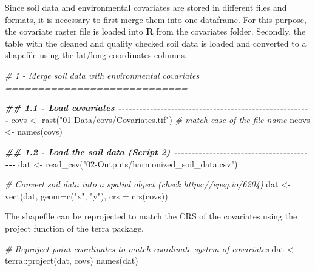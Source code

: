\documentclass[
  10pt,
  b5paper,
  oneside]{book}
\newenvironment{Shaded}{\begin{snugshade}}{\end{snugshade}}
\newcommand{\AttributeTok}[1]{\textcolor[rgb]{0.77,0.63,0.00}{#1}}
\newcommand{\CommentTok}[1]{\textcolor[rgb]{0.56,0.35,0.01}{\textit{#1}}}
\newcommand{\DocumentationTok}[1]{\textcolor[rgb]{0.56,0.35,0.01}{\textbf{\textit{#1}}}}
\newcommand{\FunctionTok}[1]{\textcolor[rgb]{0.00,0.00,0.00}{#1}}
\newcommand{\NormalTok}[1]{#1}
\newcommand{\OtherTok}[1]{\textcolor[rgb]{0.56,0.35,0.01}{#1}}
\newcommand{\SpecialCharTok}[1]{\textcolor[rgb]{0.00,0.00,0.00}{#1}}
\newcommand{\StringTok}[1]{\textcolor[rgb]{0.31,0.60,0.02}{#1}}
\begin{document}
Since soil data and environmental covariates are stored in different files and formats, it is necessary to first merge them into one dataframe. For this purpose, the covariate raster file is loaded into \textbf{R} from the covariates folder. Secondly, the table with the cleaned and quality checked soil data is loaded and converted to a shapefile using the lat/long coordinates columns.

\begin{Shaded}
\begin{Highlighting}[]
\CommentTok{\# 1 {-} Merge soil data with environmental covariates ============================}

\DocumentationTok{\#\# 1.1 {-} Load covariates {-}{-}{-}{-}{-}{-}{-}{-}{-}{-}{-}{-}{-}{-}{-}{-}{-}{-}{-}{-}{-}{-}{-}{-}{-}{-}{-}{-}{-}{-}{-}{-}{-}{-}{-}{-}{-}{-}{-}{-}{-}{-}{-}{-}{-}{-}{-}{-}{-}{-}{-}{-}{-}{-}{-}}
\NormalTok{covs }\OtherTok{\textless{}{-}} \FunctionTok{rast}\NormalTok{(}\StringTok{"01{-}Data/covs/Covariates.tif"}\NormalTok{) }\CommentTok{\# match case of the file name}
\NormalTok{ncovs }\OtherTok{\textless{}{-}} \FunctionTok{names}\NormalTok{(covs)}

\DocumentationTok{\#\# 1.2 {-} Load the soil data (Script 2) {-}{-}{-}{-}{-}{-}{-}{-}{-}{-}{-}{-}{-}{-}{-}{-}{-}{-}{-}{-}{-}{-}{-}{-}{-}{-}{-}{-}{-}{-}{-}{-}{-}{-}{-}{-}{-}{-}{-}{-}{-}}
\NormalTok{dat }\OtherTok{\textless{}{-}} \FunctionTok{read\_csv}\NormalTok{(}\StringTok{"02{-}Outputs/harmonized\_soil\_data.csv"}\NormalTok{)}

\CommentTok{\# Convert soil data into a spatial object (check https://epsg.io/6204)}
\NormalTok{dat }\OtherTok{\textless{}{-}} \FunctionTok{vect}\NormalTok{(dat, }\AttributeTok{geom=}\FunctionTok{c}\NormalTok{(}\StringTok{"x"}\NormalTok{, }\StringTok{"y"}\NormalTok{), }\AttributeTok{crs =} \FunctionTok{crs}\NormalTok{(covs))}
\end{Highlighting}
\end{Shaded}

The shapefile can be reprojected to match the CRS of the covariates using the project function of the terra package.

\begin{Shaded}
\begin{Highlighting}[]
\CommentTok{\# Reproject point coordinates to match coordinate system of covariates}
\NormalTok{dat }\OtherTok{\textless{}{-}}\NormalTok{ terra}\SpecialCharTok{::}\FunctionTok{project}\NormalTok{(dat, covs)}
\FunctionTok{names}\NormalTok{(dat) }
\end{Highlighting}
\end{Shaded}
\end{document}
